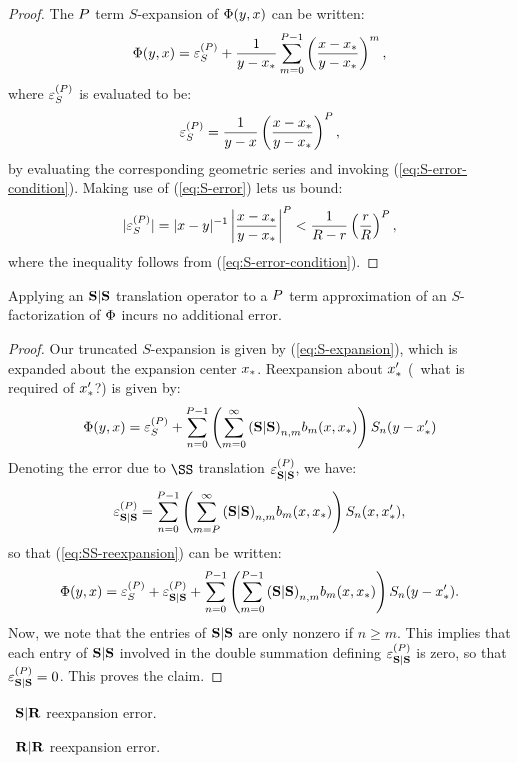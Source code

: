 \begin{proof}
  The $P$ term $S$-expansion of $\Phi(y, x)$ can be
  written:
  \begin{align}
    \label{eq:S-expansion}
    \Phi(y, x) = {\varepsilon}^{(P)}_{S} + \frac{1}{y - {x}_{*}} \sum_{m=0}^{P-1} \left(\frac{x - {x}_{*}}{y - {x}_{*}}\right)^m,
  \end{align}
  where ${\varepsilon}^{(P)}_{S}$ is evaluated to be:
  \begin{align}
    \label{eq:S-error}
    {\varepsilon}^{(P)}_{S} = \frac{1}{y - x} \left(\frac{x - {x}_{*}}{y - {x}_{*}}\right)^P,
  \end{align}
  by evaluating the corresponding geometric series and invoking
  (\ref{eq:S-error-condition}). Making use of (\ref{eq:S-error}) lets
  us bound:
  \begin{align}
    \label{eq:S-error-bound}
    |{\varepsilon}^{(P)}_{S}| = |x - y|^{-1} \left|\frac{x - {x}_{*}}{y - {x}_{*}}\right|^P < \frac{1}{R - r} \left(\frac{r}{R}\right)^P,
  \end{align}
  where the inequality follows from (\ref{eq:S-error-condition}).
\end{proof}

\begin{lemma}\label{lemma:SS-error}
  Applying an $\bold{S}|\bold{S}$ translation operator to a $P$ term
  approximation of an $S$-factorization of $\Phi$ incurs no
  additional error.
\end{lemma}

\begin{proof}
  Our truncated $S$-expansion is given by (\ref{eq:S-expansion}),
  which is expanded about the expansion center ${x}_{*}$. Reexpansion
  about ${x}_{*}'$ (\TODO\ what is required of ${x}_{*}'$?) is given by:
  \begin{align}\label{eq:SS-reexpansion}
    \Phi(y, x) = {\varepsilon}^{(P)}_{S} + \sum_{n=0}^{P-1} \left(\sum_{m=0}^{\infty} {(\bold{S}|\bold{S})}_{n,m} b_{m}(x, {x}_{*})\right) S_n(y - {x}_{*}')
  \end{align}
  Denoting the error due to $\SS$ translation ${\varepsilon}^{(P)}_{\bold{S}|\bold{S}}$, we have:
  \begin{align}\label{eq:SS-error}
    {\varepsilon}^{(P)}_{\bold{S}|\bold{S}} = \sum_{n=0}^{P-1} \left(\sum_{m=P}^\infty {(\bold{S}|\bold{S})}_{n,m} b_m(x, {x}_{*})\right) S_n(x, {x}_{*}'),
  \end{align}
  so that (\ref{eq:SS-reexpansion}) can be written:
  \begin{align}
    \Phi(y, x) = {\varepsilon}^{(P)}_{S} + {\varepsilon}^{(P)}_{\bold{S}|\bold{S}} + \sum_{n=0}^{P-1} \left(\sum_{m=0}^{P-1} {(\bold{S}|\bold{S})}_{n,m} b_{m}(x, {x}_{*})\right) S_n(y - {x}_{*}').
  \end{align}
  Now, we note that the entries of $\bold{S}|\bold{S}$ are only nonzero if
  $n \geq m$. This implies that each entry of $\bold{S}|\bold{S}$ involved in the
  double summation defining ${\varepsilon}^{(P)}_{\bold{S}|\bold{S}}$ is zero, so that
  ${\varepsilon}^{(P)}_{\bold{S}|\bold{S}} = 0$. This proves the claim.
\end{proof}

\begin{lemma}\label{lemma:SR-error}
  \TODO\ $\bold{S}|\bold{R}$ reexpansion error.
\end{lemma}

\begin{lemma}\label{lemma:RR-error}
  \TODO\ $\bold{R}|\bold{R}$ reexpansion error.
\end{lemma}

